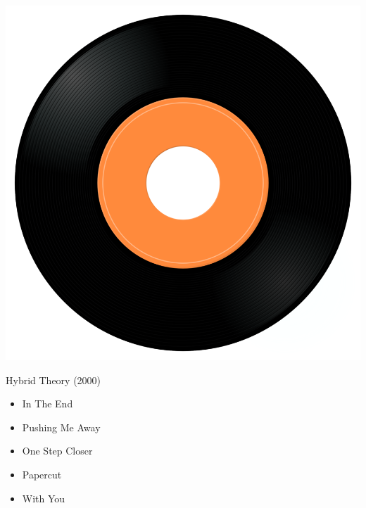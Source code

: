 \begin{minipage}[t]{0.25\textwidth}
\captionsetup{type=figure}
\includegraphics[width=\textwidth]{Images/cover.png}
\caption*{Hybrid Theory (2000)}
\end{minipage}
\begin{minipage}[t]{0.25\textwidth}\vspace{0pt}
\begin{itemize}[nosep,leftmargin=1em,labelwidth=*,align=left]
	\setlength{\itemsep}{0pt}
	\item In The End
	\item Pushing Me Away
	\item One Step Closer
	\item Papercut
	\item With You
\end{itemize}
\end{minipage}
